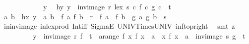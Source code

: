 \begin{isabellebody}
\ \ \ \ \isamarkupfalse%
\isanewline
\ \ \ \ \ \ \isamarkupfalse%
\ y\ \isamarkupfalse%
\ hy{\isacharcolon}{\kern0pt}\ {\isachardoublequoteopen}y\ {\isasymin}\ inv{\isacharunderscore}{\kern0pt}image\ {\isacharparenleft}{\kern0pt}r\ {\isacharless}{\kern0pt}{\isacharasterisk}{\kern0pt}lex{\isacharasterisk}{\kern0pt}{\isachargreater}{\kern0pt}\ s{\isacharparenright}{\kern0pt}\ {\isacharparenleft}{\kern0pt}{\isasymlambda}c{\isachardot}{\kern0pt}\ {\isacharparenleft}{\kern0pt}f\ c{\isacharcomma}{\kern0pt}\ g\ c{\isacharparenright}{\kern0pt}{\isacharparenright}{\kern0pt}\ {\isasyminter}\ t{\isachardoublequoteclose}\isanewline
\ \ \ \ \ \ \isamarkupfalse%
\ \isamarkupfalse%
\ a\ b\ \ hx{\isacharcolon}{\kern0pt}\ {\isachardoublequoteopen}y\ {\isacharequal}{\kern0pt}\ {\isacharparenleft}{\kern0pt}a{\isacharcomma}{\kern0pt}\ b{\isacharparenright}{\kern0pt}{\isachardoublequoteclose}\ \ {\isachardoublequoteopen}{\isacharparenleft}{\kern0pt}f\ a{\isacharcomma}{\kern0pt}\ f\ b{\isacharparenright}{\kern0pt}\ {\isasymin}\ r\ {\isasymor}\ {\isacharparenleft}{\kern0pt}f\ a\ {\isacharequal}{\kern0pt}\ f\ b\ {\isasymand}\ {\isacharparenleft}{\kern0pt}g\ a{\isacharcomma}{\kern0pt}\ g\ b{\isacharparenright}{\kern0pt}\ {\isasymin}\ s{\isacharparenright}{\kern0pt}{\isachardoublequoteclose}\isanewline
\ \ \ \ \ \ \ \ \isamarkupfalse%
\ in{\isacharunderscore}{\kern0pt}inv{\isacharunderscore}{\kern0pt}image\ in{\isacharunderscore}{\kern0pt}lex{\isacharunderscore}{\kern0pt}prod\ Int{\isacharunderscore}{\kern0pt}iff\ SigmaE\ UNIV{\isacharunderscore}{\kern0pt}Times{\isacharunderscore}{\kern0pt}UNIV\ inf{\isacharunderscore}{\kern0pt}top{\isacharunderscore}{\kern0pt}right\ \isamarkupfalse%
\ {\isacharparenleft}{\kern0pt}smt\ {\isacharparenleft}{\kern0pt}z{}{\isacharparenright}{\kern0pt}{\isacharparenright}{\kern0pt}\isanewline
\ \ \ \ \ \ \isamarkupfalse%
\ \isamarkupfalse%
\ {\isachardoublequoteopen}y\ {\isasymin}\ inv{\isacharunderscore}{\kern0pt}image\ r\ f\ {\isasyminter}\ t\ {\isasymunion}\ {\isacharparenleft}{\kern0pt}{\isasymUnion}a{\isasymin}range\ f{\isachardot}{\kern0pt}\ {\isacharbraceleft}{\kern0pt}x{\isachardot}{\kern0pt}\ f\ x\ {\isacharequal}{\kern0pt}\ a{\isacharbraceright}{\kern0pt}\ {\isasymtimes}\ {\isacharbraceleft}{\kern0pt}x{\isachardot}{\kern0pt}\ f\ x\ {\isacharequal}{\kern0pt}\ a{\isacharbraceright}{\kern0pt}\ {\isasyminter}\ inv{\isacharunderscore}{\kern0pt}image\ s\ g\ {\isasyminter}\ t{\isacharparenright}{\kern0pt}{\isachardoublequoteclose}\ \isanewline

\end{isabellebody}
